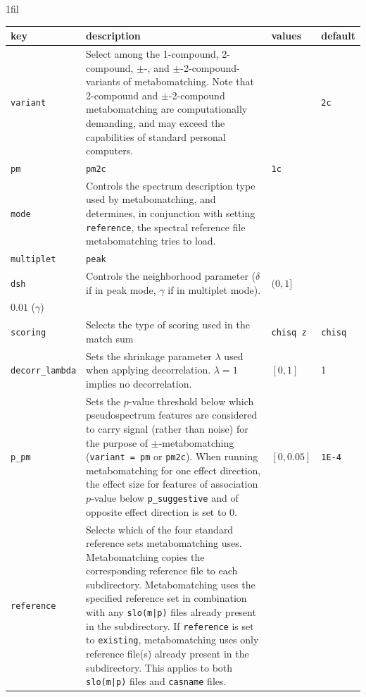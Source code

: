 \documentclass[a4paper,11pt]{article}
\makeatletter
\newcommand*{\centerfloat}{%
  \parindent \z@
  \leftskip \z@ \@plus 1fil \@minus \textwidth
  \rightskip\leftskip
  \parfillskip \z@skip}
\makeatother
\begin{document}
\begin{table}[h]
\small
\centerfloat
\begin{tabularx}{1.2\linewidth}{@{}lXll@{}}
key & description & values & default \\
\midrule
\texttt{variant} & %
Select among the 1-compound, 2-compound, $\pm$-, and $\pm$-2-compound-variants of metabomatching. Note that 2-compound and $\pm$-2-compound metabomatching are computationally demanding, and may exceed the capabilities of standard personal computers.& %
\begin{tabular}[t]{@{}ll@{}}\texttt{1c}&\texttt{2c}\\\texttt{pm}&\texttt{pm2c}\end{tabular}&\texttt{1c}\\
\texttt{mode} & Controls the spectrum description type used by metabomatching, and determines, in conjunction with setting \texttt{reference}, the spectral reference file metabomatching tries to load. & %
\begin{tabular}[t]{@{}l@{}}\texttt{peak}\\\texttt{multiplet}\end{tabular} & %
\texttt{peak} \\
\texttt{dsh} & %
Controls the neighborhood parameter ($\delta$ if in peak mode, $\gamma$ if in multiplet mode). & %
$(0,1]$ & %
\begin{tabular}[t]{@{}l@{}}$0.025$ ($\delta$)\\ $0.01$ ($\gamma$)\end{tabular}\\
\texttt{scoring} & Selects the type of scoring used in the match sum & \texttt{chisq z} & \texttt{chisq} \\
\texttt{decorr\_lambda} & Sets the shrinkage parameter $\lambda$ used when applying decorrelation. $\lambda=1$ implies no decorrelation. & $[0,1]$ & 1\\
\texttt{p\_pm} & Sets the $p$-value threshold below which pseudospectrum features are considered to carry signal (rather than noise) for the purpose of $\pm$-metabomatching (\texttt{variant = pm} or \texttt{pm2c}). When running metabomatching for one effect direction, the effect size for features of association $p$-value below \texttt{p\_suggestive} and of opposite effect direction is set to 0. & $[0,0.05]$ & \texttt{1E-4}\\
\texttt{reference} & %
Selects which of the four standard reference sets metabomatching uses. Metabomatching copies the corresponding reference file to each subdirectory. Metabomatching uses the specified reference set in combination with any \verb+slo(m|p)+ files already present in the subdirectory. If \verb|reference| is set to \verb|existing|, metabomatching uses only reference file(s) already present in the subdirectory. This applies to both \verb+slo(m|p)+ files and \verb|casname| files. & %

\end{tabularx}
\end{table}
\end{document}
